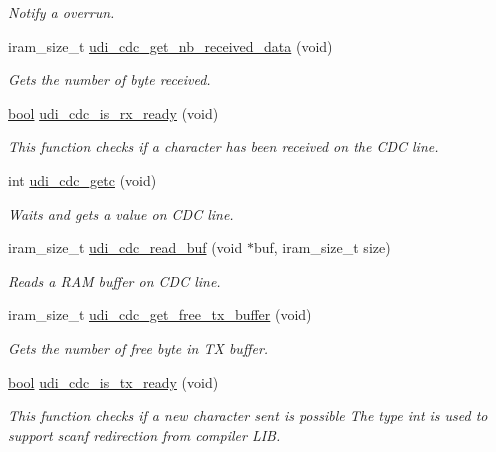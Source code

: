 \begin{DoxyCompactItemize}
\begin{DoxyCompactList}\small\item\em Notify a overrun. \end{DoxyCompactList}\item 
iram\-\_\-size\-\_\-t \hyperlink{group__udi__cdc__group_ga64d9a6a6c3404b2d7362ced2d36fe7b0}{udi\-\_\-cdc\-\_\-get\-\_\-nb\-\_\-received\-\_\-data} (void)
\begin{DoxyCompactList}\small\item\em Gets the number of byte received. \end{DoxyCompactList}\item 
\hyperlink{group__group__xmega__utils_ga97a80ca1602ebf2303258971a2c938e2}{bool} \hyperlink{group__udi__cdc__group_gab5beb4e918e089e0eacf20dba1df73ea}{udi\-\_\-cdc\-\_\-is\-\_\-rx\-\_\-ready} (void)
\begin{DoxyCompactList}\small\item\em This function checks if a character has been received on the C\-D\-C line. \end{DoxyCompactList}\item 
int \hyperlink{group__udi__cdc__group_ga202f3fd7b153f6e1a41601735e0febb6}{udi\-\_\-cdc\-\_\-getc} (void)
\begin{DoxyCompactList}\small\item\em Waits and gets a value on C\-D\-C line. \end{DoxyCompactList}\item 
iram\-\_\-size\-\_\-t \hyperlink{group__udi__cdc__group_gaf100ac6cd39574749c54d203b5d7835b}{udi\-\_\-cdc\-\_\-read\-\_\-buf} (void $\ast$buf, iram\-\_\-size\-\_\-t size)
\begin{DoxyCompactList}\small\item\em Reads a R\-A\-M buffer on C\-D\-C line. \end{DoxyCompactList}\item 
iram\-\_\-size\-\_\-t \hyperlink{group__udi__cdc__group_gac3e2670ee5ace77796c948702c295c2b}{udi\-\_\-cdc\-\_\-get\-\_\-free\-\_\-tx\-\_\-buffer} (void)
\begin{DoxyCompactList}\small\item\em Gets the number of free byte in T\-X buffer. \end{DoxyCompactList}\item 
\hyperlink{group__group__xmega__utils_ga97a80ca1602ebf2303258971a2c938e2}{bool} \hyperlink{group__udi__cdc__group_ga7d0d458a5731da95dd05f30714c42dde}{udi\-\_\-cdc\-\_\-is\-\_\-tx\-\_\-ready} (void)
\begin{DoxyCompactList}\small\item\em This function checks if a new character sent is possible The type int is used to support scanf redirection from compiler L\-I\-B. \end{DoxyCompactList}\item 

\end{DoxyCompactItemize}
